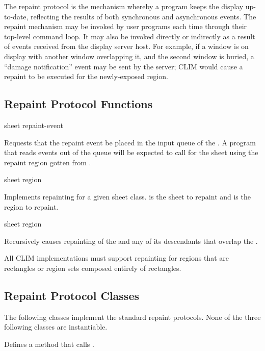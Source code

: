 The repaint protocol is the mechanism whereby a program keeps the display
up-to-date, reflecting the results of both synchronous and asynchronous events.
The repaint mechanism may be invoked by user programs each time through their
top-level command loop.  It may also be invoked directly or indirectly as a
result of events received from the display server host.  For example, if a
window is on display with another window overlapping it, and the second window
is buried, a ``damage notification'' event may be sent by the server; CLIM would
cause a repaint to be executed for the newly-exposed region.


\subsection {Repaint Protocol Functions}

 {sheet repaint-event} 

Requests that the repaint event  be placed in the input queue
of the  .  A program that reads events out of the queue
will be expected to call  for the sheet using the repaint
region gotten from .

 {sheet region} 

Implements repainting for a given sheet class.   is the sheet to
repaint and  is the region to repaint.

 {sheet region} 

Recursively causes repainting of the   and any of its
descendants that overlap the  .

All CLIM implementations must support repainting for regions that are rectangles
or region sets composed entirely of rectangles.


\subsection {Repaint Protocol Classes}

The following classes implement the standard repaint protocols.  None of the
three following classes are instantiable.


Defines a  method that calls .


